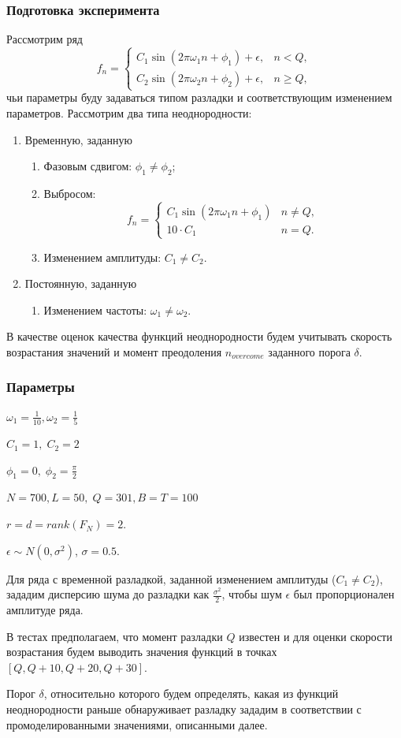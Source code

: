\documentclass[11pt]{beamer}
\begin{document}
	\begin{frame}
		\frametitle{Подготовка эксперимента}
		Рассмотрим ряд $$f_n = 
		\begin{cases}
			C_1\sin(2\pi\omega_1n + \phi_1) + \epsilon, & n < Q, \\
			C_2\sin(2\pi\omega_2n + \phi_2) + \epsilon, & n \geq Q,
		\end{cases}$$
		чьи параметры буду задаваться типом разладки и соответствующим изменением параметров.
		Рассмотрим два типа неоднородности:
		\begin{enumerate}
			\item
			Временную, заданную
			\begin{enumerate}
				\item 
				Фазовым сдвигом: $\phi_1 \neq \phi_2$;
				\item 
				Выбросом:
				$$f_n = 
				\begin{cases}
					C_1\sin(2\pi\omega_1n + \phi_1) & n \neq Q, \\
					10\cdot C_1 & n = Q.
				\end{cases}$$
				\item 
				Изменением амплитуды: $C_1 \neq C_2$.
			\end{enumerate}
			
			\item
			Постоянную, заданную
			\begin{enumerate}
				\item 
				Изменением частоты: $\omega_1 \neq \omega_2$.
			\end{enumerate}
			
		\end{enumerate}
		В качестве оценок качества функций неоднородности будем учитывать скорость возрастания значений и момент преодоления $n_{overcome}$ заданного порога $\delta$.
	\end{frame}

	\begin{frame}
		\frametitle{Параметры}
		$ \omega_1 = \frac{1}{10}, \omega_2 = \frac{1}{5} $
		
		$ C_1 = 1, \; C_2 = 2 $
		
		$ \phi_1=0,\; \phi_2=\frac{\pi}{2} $
		
		$ N = 700, L = 50, \;Q = 301, B = T = 100 $
		
		$ r=d=rank(F_N)=2$.
		
		$\epsilon \sim N(0, \sigma^2)$, $\sigma = 0.5$. 
		
		Для ряда с временной разладкой, заданной изменением амплитуды ($C_1 \neq C_2$), зададим дисперсию шума до разладки как $\frac{\sigma^2}{2}$, чтобы шум $\epsilon$ был пропорционален амплитуде ряда.
		
		\bigskip
		В тестах предполагаем, что момент разладки $Q$ известен и для оценки скорости возрастания будем выводить значения функций в точках $[Q, Q+10, Q+20, Q+30]$.
		
		Порог $ \delta $, относительно которого будем определять, какая из функций неоднородности раньше обнаруживает разладку зададим в  соответствии с промоделированными значениями, описанными далее.
		
		
	\end{frame}
\end{document}

